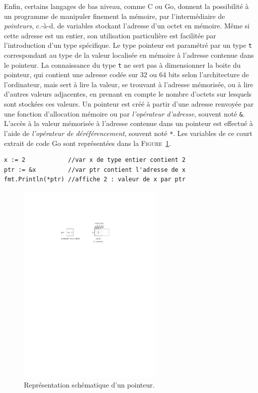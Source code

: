 \documentclass[a4paper,francais]{insalyon}
\newcommand{\cad}{c.-à-d.}
\begin{document}
Enfin, certains langages de bas niveau, comme C ou Go, donnent la possibilité à un programme de manipuler finement la mémoire, par l'intermédiaire de \emph{pointeurs}, {\cad} de variables stockant l'adresse d'un octet en mémoire. Même si cette adresse est un entier, son utilisation particulière est facilitée par l'introduction d'un type spécifique. Le type pointeur est paramétré par un type \texttt{t} correspondant au type de la valeur localisée en mémoire à l'adresse contenue dans le pointeur. La connaissance du type \texttt{t} ne sert pas à dimensionner la boite du pointeur, qui contient une adresse codée sur 32 ou 64 bits selon l'architecture de l'ordinateur, mais sert à lire la valeur, se trouvant à l'adresse mémorisée, ou à lire d'autres valeurs adjacentes, en prenant en compte le nombre d'octets sur lesquels sont stockées ces valeurs. Un pointeur est créé à partir d'une adresse renvoyée par une fonction d'allocation mémoire ou par \emph{l'opérateur d'adresse}, souvent noté \verb!&!. L'accès à la valeur mémorisée à l'adresse contenue dans un pointeur est effectué à l'aide de \emph{l'opérateur de déréférencement}, souvent noté \verb!*!. Les variables de ce court extrait de code Go sont représentées dans la \textsc{Figure}~\ref{fig:pointeur}.  
\begin{verbatim}
x := 2            //var x de type entier contient 2
ptr := &x         //var ptr contient l'adresse de x
fmt.Println(*ptr) //affiche 2 : valeur de x par ptr 
\end{verbatim}

\begin{figure}[htbp]
  \centering
  \includegraphics[width=7cm]{pointeur}
  \caption{Représentation schématique d'un pointeur.}  
  \label{fig:pointeur}
\end{figure}
\end{document}
